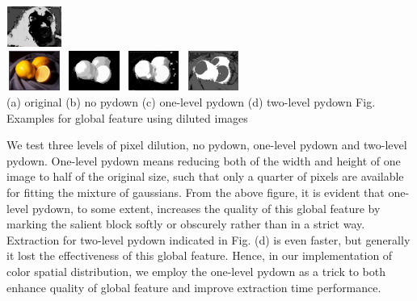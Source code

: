 \documentclass[10pt,twocolumn,letterpaper]{article}
\begin{document}
\begin{center}
    \includegraphics[width=0.72in,height=0.52in]{./Figures/pydownCompare/2DOUBLEPYDOWN.jpg} \\
    \includegraphics[width=0.72in,height=0.52in]{./Figures/pydownCompare/3.jpg}
    \includegraphics[width=0.72in,height=0.52in]{./Figures/pydownCompare/3NOPYDOWN.jpg}
    \includegraphics[width=0.72in,height=0.52in]{./Figures/pydownCompare/3PYDOWN.jpg} 
    \includegraphics[width=0.72in,height=0.52in]{./Figures/pydownCompare/3DOUBLEPYDOWN.jpg} \\
    \footnotesize (a) original (b) no pydown (c) one-level pydown (d) two-level pydown
    Fig. Examples for global feature using diluted images \\
    \end{center}

    We test three levels of pixel dilution, no pydown, one-level pydown and two-level pydown. One-level
    pydown means reducing both of the width and height of one image to half of the original size, 
    such that only a quarter of pixels are available for fitting the mixture of gaussians.
    From the above figure, it is evident that one-level pydown, to some extent, increases the quality of 
    this global feature by marking the salient block softly or obscurely rather than in a strict way. 
    Extraction for two-level pydown 
    indicated in Fig. (d) is even faster, but generally it lost the effectiveness of this global feature.
    Hence, in our implementation of color spatial distribution, we employ the one-level pydown as a trick
    to both enhance quality of global feature and improve extraction time performance.
\end{document}
